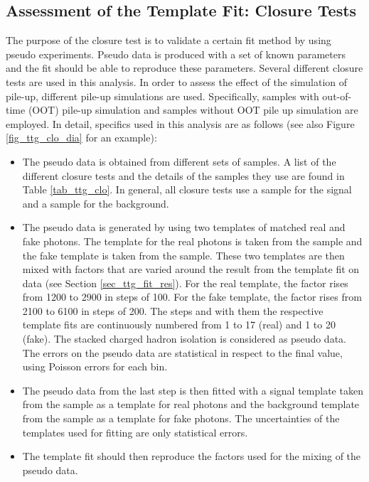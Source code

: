 \FloatBarrier
\subsection{Assessment of the Template Fit: Closure Tests}
\label{sec_ttg_clo}

The purpose of the closure test is to validate a certain fit method by using pseudo experiments. Pseudo data is produced with a set of known parameters and the fit should be able to reproduce these parameters. Several different closure tests are used in this analysis. In order to assess the effect of the simulation of pile-up, different pile-up simulations are used. Specifically, samples with out-of-time (OOT) pile-up simulation and samples without OOT pile up simulation are employed. In detail, specifics used in this analysis are as follows (see also Figure \ref{fig_ttg_clo_dia} for an example):

\begin{itemize}
\item The pseudo data is obtained from different sets of samples. A list of the different closure tests and the details of the samples they use are found in Table \ref{tab_ttg_clo}. In general, all closure tests use a \ttgamma sample for the signal and a \ttbar sample for the background.
\item The pseudo data is generated by using two templates of matched real and fake photons. The template for the real photons is taken from the \ttgamma sample and the fake template is taken from the \ttbar sample. These two templates are then mixed with factors that are varied around the result from the template fit on data (see Section \ref{sec_ttg_fit_res}). For the real template, the factor rises from 1200 to 2900 in steps of 100. For the fake template, the factor rises from 2100 to 6100 in steps of 200. The steps and with them the respective template fits are continuously numbered from 1 to 17 (real) and 1 to 20 (fake). The stacked charged hadron isolation is considered as pseudo data. The errors on the pseudo data are statistical in respect to the final value, using Poisson errors for each bin.
\item The pseudo data from the last step is then fitted with a signal template taken from the \ttgamma sample as a template for real photons and the background template from the \ttbar sample as a template for fake photons. The uncertainties of the templates used for fitting are only statistical errors.
\item The template fit should then reproduce the factors used for the mixing of the pseudo data. 
\end{itemize}

